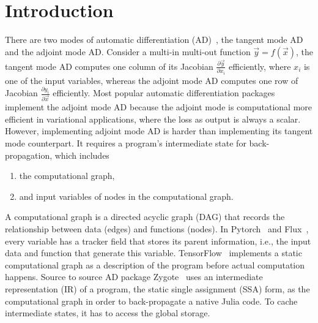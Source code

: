 \documentclass[aps,twocolumn,longbibliography,english,superscriptaddress]{revtex4-1}
\newcommand{\<}{\langle}
\renewcommand{\>}{\rangle}
\newcommand{\vx}{{\vec x}}
\newcommand{\vy}{{\vec y}}
\theoremstyle{definition}\newtheorem{definition}{\textit{Definition}}
\begin{document}
\section{Introduction}\label{sec:intro}
    There are two modes of automatic differentiation (AD)~\cite{Hascoet2013}, the tangent mode AD and the adjoint mode AD.
    Consider a multi-in multi-out function $\vy = f(\vx)$, the tangent mode AD computes one column of its Jacobian $\frac{\partial \vy}{\partial x_i}$ efficiently, where $x_i$ is one of the input variables, whereas the adjoint mode AD computes one row of Jacobian $\frac{\partial y_i}{\partial \vec{x}}$ efficiently.
Most popular automatic differentiation packages implement the adjoint mode AD because the adjoint mode is computational more efficient in variational applications, where the loss as output is always a scalar.
However, implementing adjoint mode AD is harder than implementing its tangent mode counterpart. It requires a program's intermediate state for back-propagation, which includes
\begin{enumerate}
    \item the computational graph,
    \item and input variables of nodes in the computational graph.
\end{enumerate}
    A computational graph is a directed acyclic graph (DAG) that records the relationship between data (edges) and functions (nodes).
In Pytorch~\cite{Paszke2017} and Flux~\cite{Innes2018a}, every variable has a tracker field that stores its parent information, i.e., the input data and function that generate this variable. TensorFlow~\cite{Tensorflow2015} implements a static computational graph as a description of the program before actual computation happens.
    Source to source AD package Zygote~\cite{Innes2018, Innes2019} uses an intermediate representation (IR) of a program, the static single assignment (SSA) form, as the computational graph in order to back-propagate a native Julia code. To cache intermediate states, it has to access the global storage.
\end{document}
